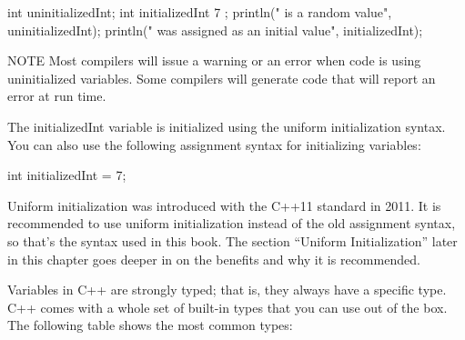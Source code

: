 \begin{cpp}
int uninitializedInt;
int initializedInt { 7 };
println("{} is a random value", uninitializedInt);
println("{} was assigned as an initial value", initializedInt);
\end{cpp}

\begin{myNotic}{NOTE}
Most compilers will issue a warning or an error when code is using uninitialized variables. Some compilers will generate code that will report an error at run time.
\end{myNotic}

The initializedInt variable is initialized using the uniform initialization syntax. You can also use the following assignment syntax for initializing variables:

\begin{cpp}
int initializedInt = 7;
\end{cpp}

Uniform initialization was introduced with the C++11 standard in 2011. It is recommended to use uniform initialization instead of the old assignment syntax, so that’s the syntax used in this book. The section “Uniform Initialization” later in this chapter goes deeper in on the benefits and why it is recommended.

Variables in C++ are strongly typed; that is, they always have a specific type. C++ comes with a whole set of built-in types that you can use out of the box. The following table shows the most common types:

